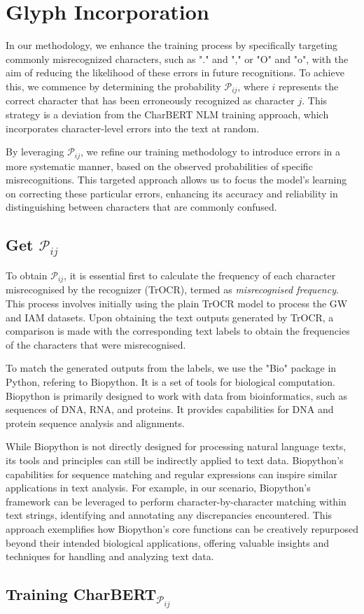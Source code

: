 \section{Glyph Incorporation}
\label{sec:3_glyph_incorporation}
In our methodology, we enhance the training process by specifically targeting commonly misrecognized characters, such as "." and "," or "O" and "o", with the aim of reducing the likelihood of these errors in future recognitions. To achieve this, we commence by determining the probability $\mathcal{P}_{ij}$, where $i$ represents the correct character that has been erroneously recognized as character $j$. This strategy is a deviation from the CharBERT NLM training approach, which incorporates character-level errors into the text at random.

By leveraging $\mathcal{P}_{ij}$, we refine our training methodology to introduce errors in a more systematic manner, based on the observed probabilities of specific misrecognitions. This targeted approach allows us to focus the model's learning on correcting these particular errors, enhancing its accuracy and reliability in distinguishing between characters that are commonly confused.

\subsection{Get $\mathcal{P}_{ij}$}
\label{subsec:3_get_pij}
To obtain $\mathcal{P}_{ij}$, it is essential first to calculate the frequency of each character misrecognised by the recognizer (TrOCR), termed as \emph{misrecognised frequency}. This process involves initially using the plain TrOCR model to process the GW and IAM datasets. Upon obtaining the text outputs generated by TrOCR, a comparison is made with the corresponding text labels to obtain the frequencies of the characters that were misrecognised.

To match the generated outputs from the labels, we use the "Bio" package in Python, refering to Biopython. It is a set of tools for biological computation. Biopython is primarily designed to work with data from bioinformatics, such as sequences of DNA, RNA, and proteins. It provides capabilities for DNA and protein sequence analysis and alignments.

While Biopython is not directly designed for processing natural language texts, its tools and principles can still be indirectly applied to text data. Biopython's capabilities for sequence matching and regular expressions can inspire similar applications in text analysis. For example, in our scenario, Biopython's framework can be leveraged to perform character-by-character matching within text strings, identifying and annotating any discrepancies encountered. This approach exemplifies how Biopython's core functions can be creatively repurposed beyond their intended biological applications, offering valuable insights and techniques for handling and analyzing text data.

\subsection{Training CharBERT$_{\mathcal{P}_{ij}}$}
\label{subsec:3_training_charbert_pij}